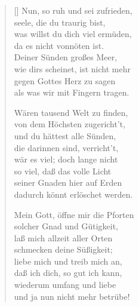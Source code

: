 \begin{multicols}{2}
\begin{verse}[\versewidth]
 Nun, so ruh und sei zufrieden,\\
seele, die du traurig bist,\\
was willst du dich viel ermüden,\\
da es nicht vonnöten ist.\\
Deiner Sünden großes Meer,\\
wie dirs scheinet, ist nicht mehr\\
gegen Gottes Herz zu sagen\\
als was wir mit Fingern tragen.

 Wären tausend Welt zu finden,\\
von dem Höchsten zugericht't,\\
und du hättest alle Sünden,\\
die darinnen sind, verricht't,\\
wär es viel; doch lange nicht\\
so viel, daß das volle Licht\\
seiner Gnaden hier auf Erden\\
dadurch könnt erlöschet werden.

 Mein Gott, öffne mir die Pforten\\
solcher Gnad und Gütigkeit,\\
laß mich allzeit aller Orten\\
schmecken deine Süßigkeit;\\
liebe mich und treib mich an,\\
daß ich dich, so gut ich kann,\\
wiederum umfang und liebe\\
und ja nun nicht mehr betrübe!


\end{verse}
\end{multicols}
